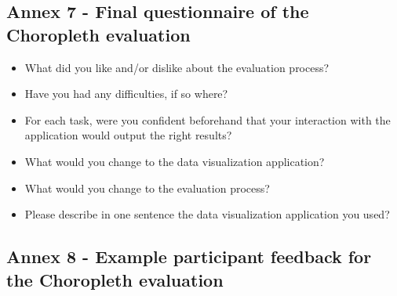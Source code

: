 \documentclass[twocolumn, letterpaper,13pt]{scrartcl}
\begin{document}
    \subsection*{Annex 7 - Final questionnaire of the Choropleth evaluation} 
    
    \begin{itemize}
        \item What did you like and/or dislike about the evaluation process?
        \item Have you had any difficulties, if so where?
        \item For each task, were you confident beforehand that your interaction with the application would output the right results?
        \item What would you change to the data visualization application?
        \item What would you change to the evaluation process?
        \item Please describe in one sentence the data visualization application you used?
    \end{itemize}
    
    \subsection*{Annex 8 - Example participant feedback for the Choropleth evaluation} 
    
\end{document}
